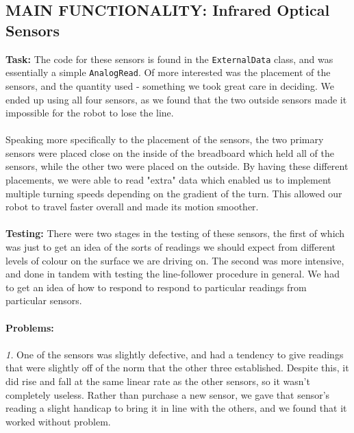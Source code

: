 \documentclass[paper=a4, fontsize=11pt]{scrartcl}
\numberwithin{equation}{section}		%
\numberwithin{figure}{section}			%
\numberwithin{table}{section}				%
\begin{document}
{\subsection{MAIN FUNCTIONALITY: Infrared Optical Sensors}
\textbf{Task: } The code for these sensors is found in the \texttt{ExternalData} class, and was essentially a simple \texttt{AnalogRead}. Of more interested was the placement of the sensors, and the quantity used - something we took great care in deciding. We ended up using all four sensors, as we found that the two outside sensors made it impossible for the robot to lose the line. 
\\\\
Speaking more specifically to the placement of the sensors, the two primary sensors were placed close on the inside of the breadboard which held all of the sensors, while the other two were placed on the outside. By having these different placements, we were able to read "extra" data which enabled us to implement multiple turning speeds depending on the gradient of the turn. This allowed our robot to travel faster overall and made its motion smoother.
\\\\
\textbf{Testing: } There were two stages in the testing of these sensors, the first of which was just to get an idea of the sorts of readings we should expect from different levels of colour on the surface we are driving on. The second was more intensive, and done in tandem with testing the line-follower procedure in general. We had to get an idea of how to respond to respond to particular readings from particular sensors. 
\\\\
\textbf{Problems: }\\\\
\textit{1.} One of the sensors was slightly defective, and had a tendency to give readings that were slightly off of the norm that the other three established. Despite this, it did rise and fall at the same linear rate as the other sensors, so it wasn't completely useless. Rather than purchase a new sensor, we gave that sensor's reading a slight handicap to bring it in line with the others, and we found that it worked without problem.
}
\end{document}
